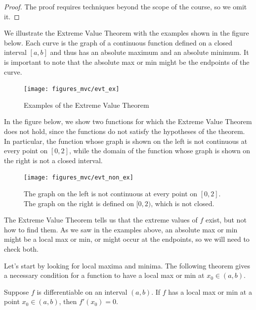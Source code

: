 \documentclass[12pt,letterpaper,reqno]{article}
\numberwithin{equation}{section}
\begin{document}
{\begin{proof}
	The proof requires techniques beyond the scope of the course, so we omit it.
\end{proof}

We illustrate the Extreme Value Theorem with the examples shown in the figure below. Each curve is the graph of a continuous function defined on a closed interval $[a,b]$ and thus has an absolute maximum and an absolute minimum. It is important to note that the absolute max or min might be the endpoints of the curve.
\begin{figure}[h]
	\begin{center}
	\texttt{[image: figures\_mvc/evt\_ex]}
	\end{center}	
	\caption{Examples of the Extreme Value Theorem}
\end{figure}
\newpage 

In the figure below, we show two functions for which the Extreme Value Theorem does not hold, since the functions do not satisfy the hypotheses of the theorem. In particular, the function whose graph is shown on the left is not continuous at every point on $[0,2]$, while the domain of the function whose graph is shown on the right is not a closed interval.

\begin{figure}[h]
	\begin{center}
	\texttt{[image: figures\_mvc/evt\_non\_ex]}
	\end{center}	
	\caption{The graph on the left is not continuous at every point on $[0,2]$. The graph on the right is defined on $[0,2)$, which is not closed.}
\end{figure}
The Extreme Value Theorem tells us that the extreme values of $f$ exist, but not how to find them. As we saw in the examples above, an absolute max or min might be a local max or min, or might occur at the endpoints, so we will need to check both.

Let's start by looking for local maxima and minima. The following theorem gives a necessary condition for a function to have a local max or min at $x_0 \in (a,b)$.

\begin{thm}\label{thm:fermats_theorem}
Suppose $f$ is differentiable on an interval $(a,b)$. If $f$ has a local max or min at a point $x_0 \in (a,b)$, then $f'(x_0)=0$.
\end{thm}

}
\end{document}
